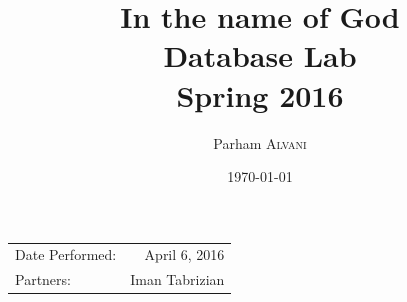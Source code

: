 \documentclass{article}
\title{In the name of God \\ Database Lab \\ Spring 2016} %
\author{Parham \textsc{Alvani}} %
\date{\today} %
\begin{document}
\maketitle %

\begin{center}
	\begin{tabular}{l r}
		Date Performed: & April 6, 2016 \\ %
		Partners: & Iman Tabrizian\\ %
	\end{tabular}
\end{center}


\end{document}
